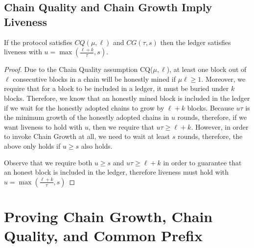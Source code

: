 



\subsection{Chain Quality and Chain Growth Imply Liveness}

\begin{theorem} If the protocol satisfies $CQ(\mu, \ell)$ and $CG(\tau,s)$ then the ledger satisfies liveness with $u = \max(\frac{\ell + k}{\tau}, s)$.
\end{theorem}

\begin{proof}
Due to the Chain Quality assumption CQ($\mu,\ell$), at least one block out of $\ell$ consecutive blocks in a chain will be honestly mined if $\mu \ell \geq 1$. Moreover, we require that for a block to be included in a ledger, it must be buried under $k$ blocks. Therefore, we know that an honestly mined block is included in the ledger if we wait for the honestly adopted chains to grow by $\ell + k$ blocks. Because $u\tau$ is the minimum growth of the honestly adopted chains in $u$ rounds, therefore, if we want liveness to hold with $u$, then we require that $u\tau \geq \ell+k$. However, in order to invoke Chain Growth at all, we need to wait at least $s$ rounds, therefore, the above only holds if $u \geq s$ also holds.

Observe that we require both $u \geq s$ and $u\tau \geq \ell + k$ in order to guarantee that an honest block is included in the ledger, therefore liveness must hold with $u = \max(\frac{\ell+k}{\tau}, s)$
\end{proof}

\section{Proving Chain Growth, Chain Quality, and Common Prefix}

